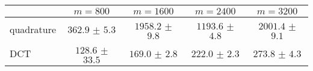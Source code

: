 \centering
\renewcommand{\arraystretch}{1.2}
\begin{tabular}{@{}lcccc@{}}
\toprule
 & $m=800$ & $m=1600$ & $m=2400$ & $m=3200$\\
\midrule
quadrature & $362.9$ $\pm$ $5.3$ & $1958.2$ $\pm$ $9.8$ & $1193.6$ $\pm$ $4.8$ & $2001.4$ $\pm$ $9.1$ \\
DCT & $128.6$ $\pm$ $33.5$ & $169.0$ $\pm$ $2.8$ & $222.0$ $\pm$ $2.3$ & $273.8$ $\pm$ $4.3$ \\
\bottomrule
\end{tabular}
